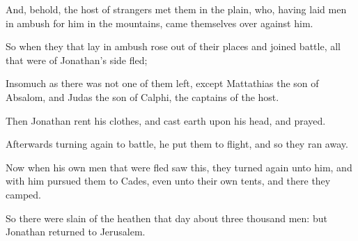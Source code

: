 {\par }{\PP {}And, behold, the host of strangers met them in the plain, who, having laid men in ambush for him in the mountains, came themselves over against him.
\par }{\PP {}So when they that lay in ambush rose out of their places and joined battle, all that were of Jonathan’s side fled;
\par }{\PP {}Insomuch as there was not one of them left, except Mattathias the son of Absalom, and Judas the son of Calphi, the captains of the host.
\par }{\PP {}Then Jonathan rent his clothes, and cast earth upon his head, and prayed.
\par }{\PP {}Afterwards turning again to battle, he put them to flight, and so they ran away.
\par }{\PP {}Now when his own men that were fled saw this, they turned again unto him, and with him pursued them to Cades, even unto their own tents, and there they camped.
\par }{\PP {}So there were slain of the heathen that day about three thousand men: but Jonathan returned to Jerusalem.

}
